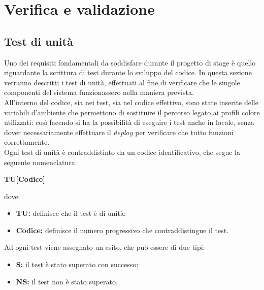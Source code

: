 \chapter{Verifica e validazione}
\label{cap:verifica-validazione}


\section{Test di unità}

Uno dei requisiti fondamentali da soddisfare durante il progetto di stage è
quello riguardante la scrittura di test durante lo sviluppo del codice. In
questa sezione verranno descritti i test di unità, effettuati al fine di
verificare che le singole componenti del sistema funzionassero nella maniera prevista. \\
All'interno del codice, sia nei test, sia nel codice effettivo, sono state
inserite delle variabili d'ambiente che permettono di sostituire il percorso
legato ai profili colore utilizzati: così facendo si ha la possibilità di
eseguire i test anche in locale, senza dover necessariamente effettuare il
\emph{deploy} per verificare che tutto funzioni correttamente.\\
Ogni test di unità è contraddistinto da un codice identificativo, che segue la
seguente nomenclatura: \\
\begin{center}
    \textbf{TU[Codice]}
\end{center}
dove:
\begin{itemize}
    \item \textbf{TU:} definisce che il test è di unità;
    \item \textbf{Codice:} definisce il numero progressivo che contraddistingue il test.
\end{itemize}

Ad ogni test viene assegnato un esito, che può essere di due tipi:
\begin{itemize}
    \item \textbf{S:} il test è stato superato con successo;
    \item \textbf{NS:} il test non è stato superato.
\end{itemize}

